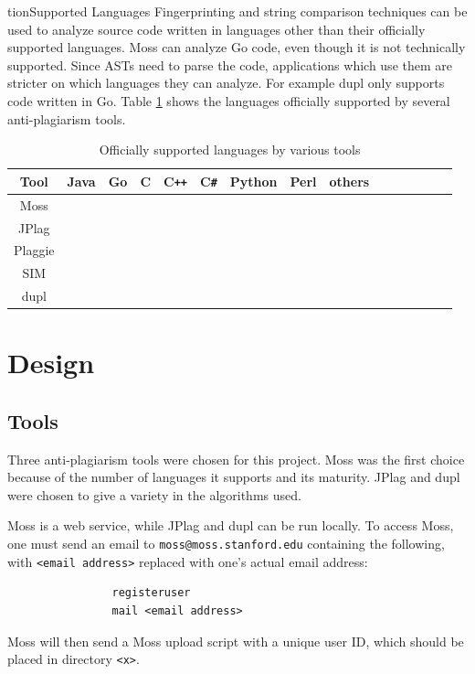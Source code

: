 \documentclass[12pt]{article}
\begin{document}
tion{Supported Languages}
			Fingerprinting and string comparison techniques can be used to analyze source code written in languages other than their officially supported languages. Moss can analyze Go code, even though it is not technically supported. Since ASTs need to parse the code, applications which use them are stricter on which languages they can analyze. For example dupl only supports code written in Go. Table \ref{tab:languageSupport} shows the languages officially supported by several anti-plagiarism tools.
		
			\begin{table}[h!]
				\begin{center}
					\caption{Officially supported languages by various tools}
					\label{tab:languageSupport}
					\begin{tabular}{ccccccccccccccc}
						\toprule
						Tool & Java & Go & C & C\verb!++! & C\verb!#! & Python & Perl & others\\
						\midrule
						Moss & \checkmark & & \checkmark & \checkmark & \checkmark & \checkmark & \checkmark & \checkmark \\
						JPlag & \checkmark & & \checkmark & \checkmark & \checkmark & & & \checkmark\\
						Plaggie & \checkmark & & & & & & & \\
						SIM & \checkmark & & \checkmark & & & & & \checkmark\\
						dupl & & \checkmark & & & & & & \\
						\bottomrule
					\end{tabular}
				\end{center}
			\end{table}
		
	\section{Design}
		\subsection{Tools}
			Three anti-plagiarism tools were chosen for this project. Moss was the first choice because of the number of languages it supports and its maturity. JPlag and dupl were chosen to give a variety in the algorithms used.
			
			Moss is a web service, while JPlag and dupl can be run locally. To access Moss, one must send an email to \verb|moss@moss.stanford.edu| containing the following, with \verb|<email address>| replaced with one's actual email address:
			\begin{verbatim}
				registeruser
				mail <email address>
			\end{verbatim}
			\noindent Moss will then send a Moss upload script with a unique user ID, which should be placed in directory \verb|<x>|.
			
\end{document}
